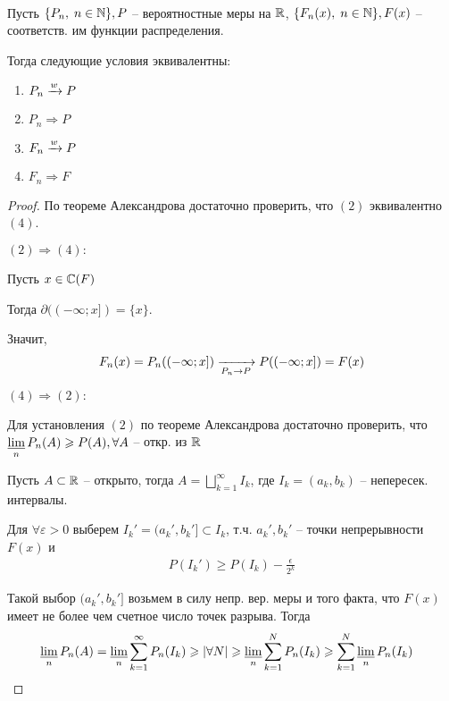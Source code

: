 \begin{theorem}~

  Пусть $\{ P_n,\; n \in \mathbb{N} \}, P$ -- вероятностные меры на $\mathbb{R}$,
  $\{ F_n(x),\; n \in \mathbb{N} \}, F(x)$ -- соответств. им функции распределения. 

  Тогда следующие условия эквивалентны:
  \begin{enumerate}
    \item $P_n \xrightarrow{w} P$
    \item $P_n \Rightarrow P$
    \item $F_n \xrightarrow{w} P$
    \item $F_n \Rightarrow F$
  \end{enumerate}

  \begin{proof}
    По теореме Александрова достаточно проверить, что $(2)$ эквивалентно $(4)$.

    $(2) \Rightarrow (4):$ 

    Пусть $x \in \mathbb{C}(F)$

    Тогда $\partial((-\infty; x]) = \{ x \}$.

    Значит,
    \begin{align*}
      F_n(x) = P_n((-\infty; x]) \xrightarrow[P_n \to P]{} P((-\infty; x]) = F(x)
    \end{align*}

    $(4) \Rightarrow (2):$ 

    Для установления $(2)$ по теореме Александрова достаточно проверить, 
    что $\varliminf\limits_n P_n(A) \geqslant P(A), \forall A$ -- откр. из $\mathbb{R}$

    Пусть $A \subset \mathbb{R}$ -- открыто, 
    тогда $A = \bigsqcup\limits_{k = 1}^{\infty} I_k$, 
    где $I_k = (a_k, b_k)$ -- непересек. интервалы.

    Для $\forall \varepsilon > 0$
    выберем $I_{k}' = (a_{k}', b_{k}'] \subset I_{k}$,
    т.ч. $a_k', b_k'$ -- точки непрерывности $F(x)$ и
    \begin{align*}
      P(I_k') \geq P(I_k) - \frac{\epsilon}{2^k}
    \end{align*}

    Такой выбор $(a_k', b_k']$ возьмем в силу непр. вер. меры и того факта, 
    что $F(x)$ имеет не более чем счетное  число точек разрыва. 
    Тогда
    \begin{align*}
      &\varliminf\limits_n P_n(A) = \varliminf\limits_n \sum_{k = 1}^{\infty} P_n (I_k) \geqslant |\forall N|
      \geqslant \varliminf\limits_n \sum_{k = 1}^{N} P_n(I_k) \geqslant \sum_{k = 1}^{N} \varliminf\limits_n P_n(I_k)
    \end{align*}


\end{proof}
\end{theorem}
